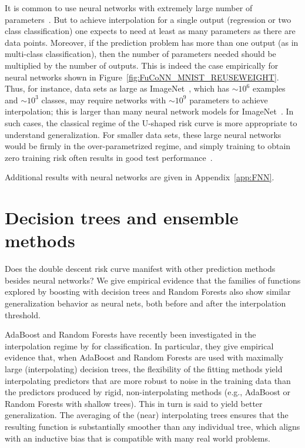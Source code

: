 \documentclass[11pt]{article}
\begin{document}
It is common to use neural networks with extremely large number of parameters~\cite{canziani2016analysis}.
But to achieve interpolation for a single output (regression or two class classification) one expects to need at least as many parameters as there are data points.
Moreover, if the prediction problem has more than one output (as in multi-class classification), then the number of parameters needed should be multiplied by the number of outputs. This is indeed the case empirically for neural networks shown in Figure~\ref{fig:FuCoNN_MNIST_REUSEWEIGHT}.
Thus, for instance, data sets as large as ImageNet~\cite{ILSVRC15}, which has ${\sim}10^6$ examples and ${\sim}10^3$ classes, may require networks with ${\sim}10^9$ parameters to achieve interpolation; this is larger than many neural network models for ImageNet~\cite{canziani2016analysis}.
In such cases, the classical regime of the U-shaped risk curve is more appropriate to understand generalization.
For smaller data sets, these large neural networks  would be firmly in the over-parametrized regime, and simply training to obtain zero training risk often results in good test performance~\cite{zhang2016understanding}.

Additional results with neural networks are given in Appendix~\ref{app:FNN}.


\section{Decision trees and ensemble methods}

Does the double descent risk curve manifest with other prediction methods besides neural networks?
We give empirical evidence that the families of functions explored by boosting with decision trees and Random Forests also show similar generalization behavior as neural nets, both before and after the interpolation threshold.

AdaBoost and Random Forests have recently been investigated in the interpolation regime by \cite{wyner2017explaining} for classification.
In particular, they give empirical evidence that, when AdaBoost and Random Forests are used with maximally large (interpolating) decision trees, the flexibility of the fitting methods yield interpolating predictors that are more robust to noise in the training data than the predictors produced by rigid, non-interpolating methods (e.g., AdaBoost or Random Forests with shallow trees).
This in turn is said to yield better generalization.
The averaging of the (near) interpolating trees ensures that the resulting function is substantially smoother than any individual tree, which aligns with an inductive bias that is compatible with many real world problems.
\end{document}
